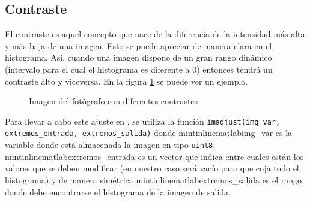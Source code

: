 \subsection{Contraste}
El contraste es aquel concepto que nace de la diferencia de la intensidad más alta y más baja de una imagen. Esto se puede apreciar de manera clara en el histograma. Así, cuando una imagen dispone de un gran rango dinámico (intervalo para el cual el histograma es diferente a 0) entonces tendrá un contraste alto y viceversa. En la figura \ref{fig:contraste} se puede ver un ejemplo.
\begin{figure}
\centering
    \quad
    \quad
    \caption{Imagen del fotógrafo con diferentes contrastes\label{fig:contraste}}
\end{figure}

Para llevar a cabo este ajuste en \MATLAB, se utiliza la función \texttt{imadjust(img_var, extremos_entrada, extremos_salida)} donde mintinline{matlab}{img_var} es la variable donde está almacenada la imagen en tipo \texttt{uint8}, mintinline{matlab}{extremos_entrada} es un vector que indica entre cuales están los valores que se deben modificar (en nuestro caso será vacío para que coja todo el histograma) y de manera simétrica mintinline{matlab}{extremos_salida} es el rango donde debe encontrarse el histograma de la imagen de salida.

